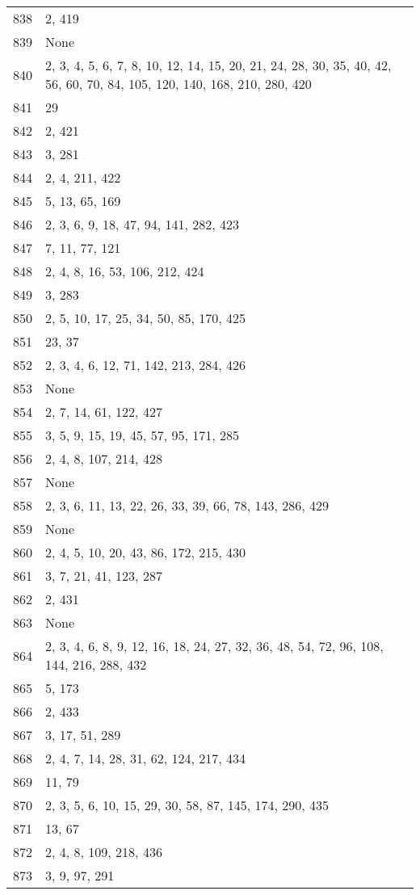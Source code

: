 \documentclass[12pt]{article}
\begin{document}
\begin{tabular}{|r|l|}
838 & 2, 419 \\ 
839 & None \\ 
840 & 2, 3, 4, 5, 6, 7, 8, 10,  12, 14, 15, 20, 21, 24,  28, 30, 35, 40, 42, 56, 60, 70, 84, 105, 120, 140, 168, 210, 280, 420 \\ 
841 & 29 \\ 
842 & 2, 421 \\ 
843 & 3, 281 \\ 
844 & 2, 4, 211, 422 \\ 
845 & 5, 13, 65, 169 \\ 
846 & 2, 3, 6, 9, 18, 47, 94, 141, 282, 423 \\ 
847 & 7, 11, 77, 121 \\ 
848 & 2, 4, 8, 16, 53, 106, 212, 424 \\ 
849 & 3, 283 \\ 
850 & 2, 5, 10, 17,  25, 34, 50, 85, 170, 425 \\ 
851 & 23, 37 \\ 
852 & 2, 3, 4, 6, 12, 71, 142, 213,  284, 426 \\ 
853 & None \\ 
854 & 2, 7, 14, 61, 122, 427 \\ 
855 & 3, 5, 9, 15, 19, 45, 57, 95, 171, 285 \\ 
856 & 2, 4, 8, 107, 214, 428 \\ 
857 & None \\ 
858 & 2, 3, 6,  11, 13, 22, 26, 33, 39, 66, 78, 143, 286, 429 \\ 
859 & None \\ 
860 & 2, 4, 5, 10, 20, 43, 86, 172, 215, 430 \\ 
861 & 3, 7,  21, 41, 123, 287 \\ 
862 & 2, 431 \\ 
863 & None \\ 
864 & 2, 3, 4,  6, 8, 9, 12, 16, 18, 24, 27, 32, 36, 48, 54, 72, 96, 108, 144, 216, 288, 432 \\ 
865 & 5, 173 \\ 
866 & 2, 433 \\ 
867 & 3, 17, 51, 289 \\ 
868 & 2, 4, 7, 14, 28, 31, 62, 124, 217, 434 \\ 
869 & 11, 79 \\ 
870 & 2, 3, 5, 6, 10, 15, 29, 30, 58, 87, 145, 174, 290, 435 \\ 
871 & 13, 67 \\ 
872 & 2, 4, 8, 109, 218, 436 \\ 
873 & 3, 9, 97, 291 \\ 

\end{tabular}
\end{document}
